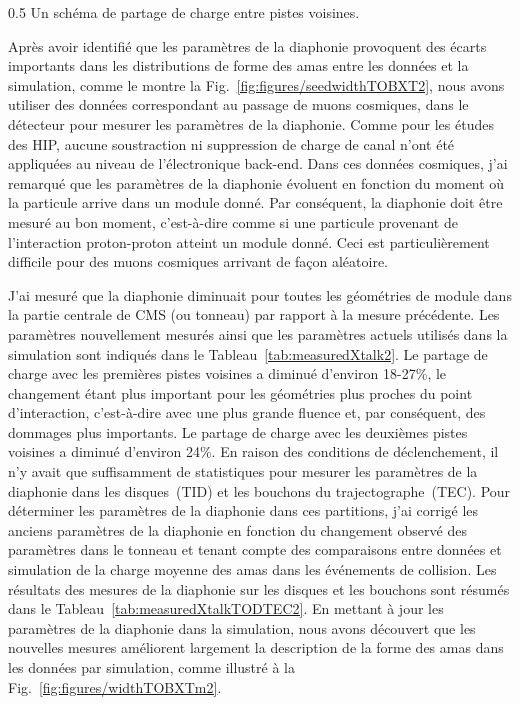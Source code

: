                 {0.5}       %
                 {Un schéma de partage de charge entre pistes voisines. }


Après avoir identifié que les paramètres de la diaphonie provoquent des écarts importants dans les distributions de forme des amas entre les données et la simulation, comme le montre la Fig.~\ref{fig:figures/seedwidthTOBXT2}, nous avons utiliser des données correspondant au passage de muons cosmiques, dans le détecteur  pour mesurer les paramètres de la diaphonie. Comme pour les études des HIP, aucune soustraction ni suppression de charge de canal n’ont été appliquées au niveau de l’électronique back-end. Dans ces données cosmiques, j'ai remarqué que les paramètres de la diaphonie évoluent en fonction du moment où la particule arrive dans un module donné. Par conséquent, la diaphonie doit être mesuré au bon moment, c'est-à-dire comme si une particule provenant de l'interaction proton-proton atteint un module donné. Ceci est particulièrement difficile pour des muons cosmiques arrivant de façon aléatoire.

J'ai mesuré que la diaphonie diminuait pour toutes les géométries de module dans la partie centrale de CMS (ou tonneau) par rapport à la mesure précédente. Les paramètres nouvellement mesurés ainsi que les paramètres actuels utilisés dans la simulation sont indiqués dans le Tableau~\ref{tab:measuredXtalk2}. Le partage de charge avec les premières pistes voisines a diminué d'environ 18-27\%, le changement étant plus important pour les géométries plus proches du point d'interaction, c'est-à-dire avec une plus grande fluence et, par conséquent, des dommages plus importants. Le partage de charge avec les deuxièmes pistes voisines a diminué d'environ 24\%. En raison des conditions de déclenchement, il n'y avait que suffisamment de statistiques pour mesurer les paramètres de la diaphonie dans les disques~(TID) et les bouchons du trajectographe~(TEC). Pour déterminer les paramètres de la diaphonie dans ces partitions, j'ai corrigé les anciens paramètres de la diaphonie en fonction du changement observé des paramètres dans le tonneau et tenant compte des comparaisons entre  données et simulation de la charge moyenne des amas dans les événements de collision. Les résultats des mesures de la diaphonie sur les disques et les bouchons sont résumés dans le Tableau~\ref{tab:measuredXtalkTODTEC2}. En mettant à jour les paramètres de la diaphonie dans la simulation, nous avons découvert que les nouvelles mesures améliorent largement la description de la forme des amas dans les données par simulation, comme illustré à la Fig.~\ref{fig:figures/widthTOBXTm2}.

